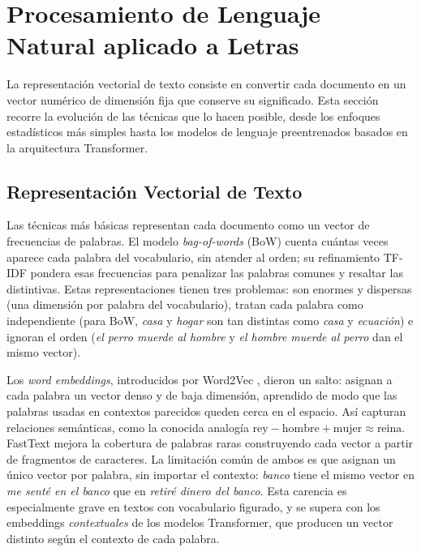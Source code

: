 \section{Procesamiento de Lenguaje Natural aplicado a Letras}
\label{sec:nlp-musica}


La representación vectorial de texto consiste en convertir cada documento en un vector numérico de dimensión fija que conserve su significado. Esta sección recorre la evolución de las técnicas que lo hacen posible, desde los enfoques estadísticos más simples hasta los modelos de lenguaje preentrenados basados en la arquitectura Transformer.

\subsection{Representación Vectorial de Texto}
\label{subsec:representacion-vectorial}

Las técnicas más básicas representan cada documento como un vector de frecuencias de palabras. El modelo \textit{bag-of-words} (BoW) cuenta cuántas veces aparece cada palabra del vocabulario, sin atender al orden; su refinamiento TF-IDF pondera esas frecuencias para penalizar las palabras comunes y resaltar las distintivas. Estas representaciones tienen tres problemas: son enormes y dispersas (una dimensión por palabra del vocabulario), tratan cada palabra como independiente (para BoW, \textit{casa} y \textit{hogar} son tan distintas como \textit{casa} y \textit{ecuación}) e ignoran el orden (\textit{el perro muerde al hombre} y \textit{el hombre muerde al perro} dan el mismo vector).

Los \textit{word embeddings}, introducidos por Word2Vec \parencite{mikolov_2013_word2vec}, dieron un salto: asignan a cada palabra un vector denso y de baja dimensión, aprendido de modo que las palabras usadas en contextos parecidos queden cerca en el espacio. Así capturan relaciones semánticas, como la conocida analogía $\text{rey} - \text{hombre} + \text{mujer} \approx \text{reina}$. FastText \parencite{bojanowski_2017_fasttext} mejora la cobertura de palabras raras construyendo cada vector a partir de fragmentos de caracteres. La limitación común de ambos es que asignan un único vector por palabra, sin importar el contexto: \textit{banco} tiene el mismo vector en \textit{me senté en el banco} que en \textit{retiré dinero del banco}. Esta carencia es especialmente grave en textos con vocabulario figurado, y se supera con los embeddings \textit{contextuales} de los modelos Transformer, que producen un vector distinto según el contexto de cada palabra.


